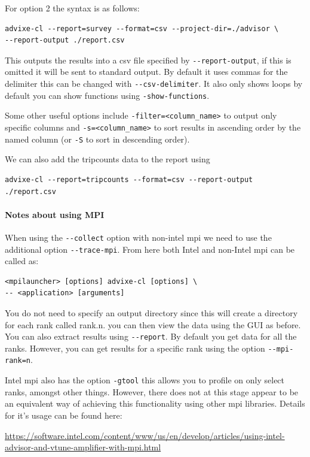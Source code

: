 \documentclass[a4paper, 11pt]{article}
\begin{document}
 For option 2 the syntax is as follows:
 \begin{verbatim}
advixe-cl --report=survey --format=csv --project-dir=./advisor \
--report-output ./report.csv
\end{verbatim}

This outputs the results into a csv file specified by \verb+--report-output+, if this is omitted it will be sent to standard output. By default it uses commas for the delimiter this can be changed with \verb+--csv-delimiter+. It also only shows loops by default you can show functions using \verb+-show-functions+.

Some other useful options include \verb+-filter=<column_name>+ to output only specific columns and \verb+-s=<column_name>+ to sort results in ascending order by the named column (or \verb+-S+ to sort in descending order).

We can also add the tripcounts data to the report using 
 \begin{verbatim}
advixe-cl --report=tripcounts --format=csv --report-output ./report.csv
\end{verbatim}

\paragraph{Notes about using MPI} When using the \verb+--collect+ option with non-intel mpi we need to use the additional option \verb+--trace-mpi+. From here both Intel and non-Intel mpi can be called as:
 \begin{verbatim}
<mpilauncher> [options] advixe-cl [options] \
-- <application> [arguments] 
\end{verbatim}

You do not need to specify an output directory since this will create a directory for each rank called rank.n. you can then view the data using the GUI as before. You can also extract results using \verb+--report+. By default you get data for all the ranks. However, you can get results for a specific rank using the option \verb+--mpi-rank=n+. 

Intel mpi also has the option \verb+-gtool+ this allows you to profile on only select ranks, amongst other things. However, there does not at this stage appear to be an equivalent way of achieving this functionality using other mpi libraries. Details for it's usage can be found here: 

\url{https://software.intel.com/content/www/us/en/develop/articles/using-intel-advisor-and-vtune-amplifier-with-mpi.html}
\end{document}
